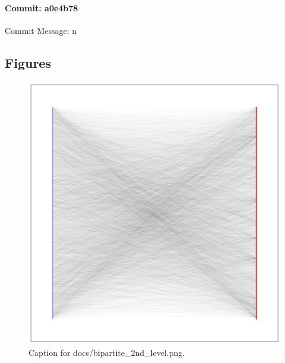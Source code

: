 \documentclass{article}
\begin{document}
\paragraph{Commit: a0e4b78}
Commit Message: n

\subsection{Figures}
\begin{figure}[h] \centering \includegraphics{docs/bipartite_2nd_level.png} \caption{Caption for docs/bipartite_2nd_level.png.} \end{figure}
\end{document}
